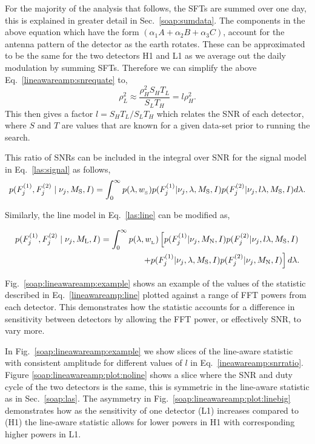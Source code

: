 For the majority of the analysis that follows, the \glspl{SFT} are summed over one day, this is explained in greater detail in Sec.~\ref{soap:sumdata}. 
The components in the above equation which have the form $(\alpha_1A +
\alpha_2B + \alpha_3C)$, account for the antenna pattern of the detector as the earth rotates.
These can be approximated to be the same for the two detectors H1 and L1 as we average out the daily modulation by summing \glspl{SFT}.
Therefore we can simplify the above Eq.~\ref{lineawareamp:snrequate} to, 
\begin{equation}
\label{lineawareamp:snrratio}
    \rho_L^2 \approx \frac{\rho_H^2 S_H T_L}{S_L T_H} = l \rho_H^2 .
\end{equation}
This then gives a factor $l = S_H T_L/S_L T_H$ which relates the \gls{SNR} of each detector, where $S$ and $T$ are values that are known for a given data-set prior to running the search.

This ratio of \glspl{SNR} can be included in the integral over \gls{SNR} for the signal model in Eq.~\ref{las:signal} as follows,
\begin{equation}
\label{lineawareamp:signal}
p(F^{(1)}_{j},F^{(2)}_{j} \mid \nu_j,M_{\rm{S}},I) = \int_0^{\infty}  p(\lambda,w_{\rm_S}) 
p(F^{(1)}_{j}|\nu_j,\lambda,M_{\text{S}},I)p(F^{(2)}_{j}|\nu_j,l\lambda,M_{\text{S}},I) d\lambda.
\end{equation}

Similarly, the line model in Eq.~\ref{las:line} can be modified as,

\begin{equation}
\label{lineawareamp:line}
\begin{split}
p(F^{(1)}_{j},F^{(2)}_{j} \mid \nu_j,M_{\rm{L}},I) = \int_0^{\infty}  p(\lambda,w_{\rm_L}) 
\left[ p(F^{(1)}_{j}|\nu_j,M_{\rm{N}},I)p(F^{(2)}_{j}|\nu_j,l\lambda,M_{\rm{S}},I) \right. \\
\left. + p(F^{(1)}_{j}|\nu_j,\lambda,M_{\rm{S}},I)p(F^{(2)}_{j}|\nu_j,M_{\rm{N}},I)\right]d\lambda .
\end{split}
\end{equation}

Fig.~\ref{soap:lineawareamp:example} shows an example of the values of the
statistic described in Eq.~\ref{lineawareamp:line} plotted against a range of
\gls{FFT} powers from each detector. This demonstrates how the statistic
accounts for a difference in sensitivity between detectors by allowing the \gls{FFT}
power, or effectively \gls{SNR}, to vary more.

In Fig.~\ref{soap:lineawareamp:example} we show slices of the line-aware statistic with consistent amplitude for different values of $l$ in Eq.~\ref{ineawareamp:snrratio}. 
Figure \ref{soap:lineawareamp:plot:noline} shows a slice where the \gls{SNR} and duty cycle of the two detectors is the same, this is symmetric in the line-aware statistic as in Sec.~\ref{soap:las}.
The asymmetry in Fig.~\ref{soap:lineawareamp:plot:linebig} demonstrates how as the sensitivity of one detector (L1) increases compared to (H1) the line-aware statistic allows for lower powers in H1 with corresponding higher powers in L1.


